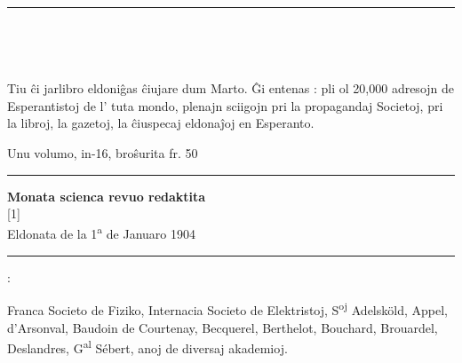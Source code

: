 %
%
\thispagestyle{plain}
{\centering
{\footnotesize {}\par}
\rule[0.9ex]{\textwidth}{0.4pt}

{}\\[1ex]
\parbox{0.7\textwidth}{}\\[1ex]
{\footnotesize{}}\par

{\par}
}

{\footnotesize Tiu ĉi jarlibro eldoniĝas ĉiujare dum Marto.  Ĝi entenas : pli ol 20,000 adresojn de Esperantistoj de l’ tuta mondo, plenajn sciigojn pri la propagandaj Societoj, pri la libroj, la gazetoj, la ĉiuspecaj eldonaĵoj en Esperanto.}

\newlength{\tempindent}
\setlength{\tempindent}{\parindent}
\setlength{\parindent}{0pt}
{\footnotesize Unu volumo, in-16, broŝurita  fr. 50}
\setlength{\parindent}{\tempindent}

{\centering
\rule[0.9ex]{\textwidth}{0.4pt}
{}

\vspace{0.5em}
{}
\vspace{0.5em}

{\small \bf Monata scienca revuo redaktita} \\
{\latin\scalebox{1.5}[1]{}} \\
{Eldonata de la 1\textsuperscript{a} de Januaro 1904}

\rule[0.9ex]{13mm}{0.4pt}

{ :\par}
}

{\footnotesize Franca Societo de Fiziko, Internacia Societo de Elektristoj, S\textsuperscript{oj} Adelsköld, Appel, d’Arsonval, Baudoin de Courtenay, Becquerel, Berthelot, Bouchard, Brouardel, Deslandres, G\textsuperscript{al} Sébert, anoj de diversaj akademioj.}

